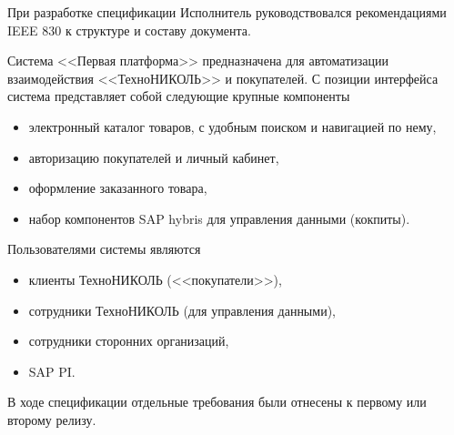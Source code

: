 

%



При разработке спецификации Исполнитель руководствовался рекомендациями IEEE 830 к структуре и составу документа.


Система <<Первая платформа>> предназначена для автоматизации взаимодействия <<ТехноНИКОЛЬ>> и покупателей. С позиции интерфейса система представляет собой следующие крупные компоненты 
\begin{itemize}
\item электронный каталог товаров, с удобным поиском и навигацией по нему,
\item авторизацию покупателей и личный кабинет,
\item оформление заказанного товара,
\item набор компонентов SAP hybris для управления данными (кокпиты).
\end{itemize}


Пользователями системы являются 
\begin{itemize}
\item клиенты ТехноНИКОЛЬ (<<покупатели>>), 
\item сотрудники ТехноНИКОЛЬ (для управления данными),
\item сотрудники сторонних организаций,
\item SAP PI.
\end{itemize}


В ходе спецификации отдельные требования были отнесены к первому или второму релизу. 